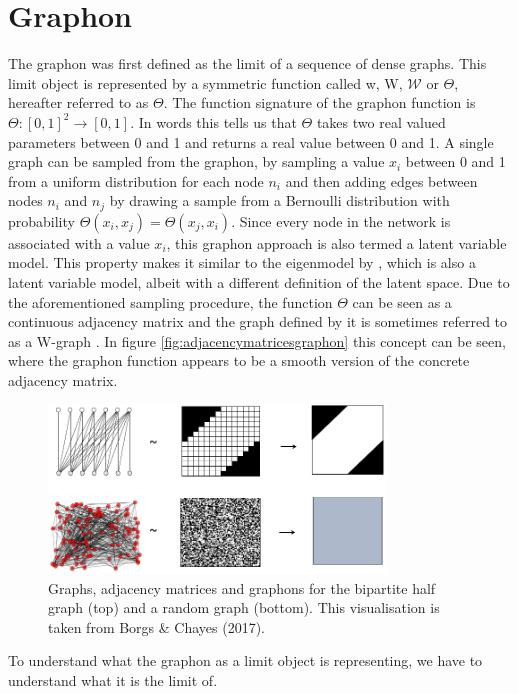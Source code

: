 \documentclass[11pt]{report} %
\begin{document}
    \section{Graphon}
The graphon was first defined as the limit of a sequence of dense graphs. 
This limit object is represented by a symmetric function called w, W, $\mathcal{W}$ or $\Theta$, hereafter referred to as $\Theta$. 
The function signature of the graphon function is $\Theta: [0,1]^2 \rightarrow [0,1]$. 
In words this tells us that $\Theta$ takes two real valued parameters between 0 and 1 and returns a real value between 0 and 1. 
A single graph can be sampled from the graphon, by sampling a value $x_i$ between 0 and 1 from a uniform distribution for each node $n_i$ and then adding edges between nodes $n_i$ and $n_j$ by drawing a sample from a Bernoulli distribution with probability $\Theta(x_i,x_j)=\Theta(x_j,x_i)$.
Since every node in the network is associated with a value $x_i$, this graphon approach is also termed a latent variable model.
This property makes it similar to the eigenmodel by , which is also a latent variable model, albeit with a different definition of the latent space.
Due to the aforementioned sampling procedure, the function $\Theta$ can be seen as a continuous adjacency matrix and the graph defined by it is sometimes referred to as a W-graph \cite{latouche2016}. 
In figure \ref{fig:adjacencymatricesgraphon} this concept can be seen, where the graphon function appears to be a smooth version of the concrete adjacency matrix. 
\begin{figure}[H]
    \center
    \includegraphics[width= 0.8\textwidth]{borgs2017graphon}%
    \caption{Graphs, adjacency matrices and graphons for the bipartite half graph (top) and a random graph (bottom). This visualisation is taken from Borgs \& Chayes (2017).}
    \label{fig:graphonexample}
\end{figure}
\noindent
To understand what the graphon as a limit object is representing, we have to understand what it is the limit of. 
\end{document}
